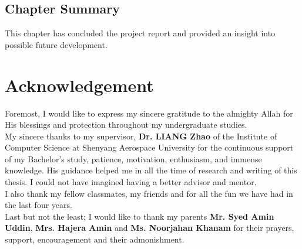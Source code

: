 \documentclass[12pt,a4paper]{article}
\newcommand\tab[1][1cm]{\hspace*{#1}}
\begin{document}
\subsection{Chapter Summary}	
\tab This chapter has concluded the project report and provided an insight into possible future development.
	


\newpage


\newpage
\section*{Acknowledgement}
	\tab Foremost, I would like to express my sincere gratitude to the almighty Allah for His blessings and protection throughout my undergraduate studies.\\ 
\tab My sincere thanks to my supervisor,  \textbf{Dr. LIANG Zhao} of the Institute of Computer Science at Shenyang Aerospace University for the continuous support of my Bachelor's study, patience, motivation, enthusiasm, and immense knowledge. His guidance helped me in all the time of research and writing of this thesis. I could not have imagined having a better advisor and mentor.\\
        \tab I also thank my fellow classmates, my friends and for all the fun we have had in the last four years.\\
        \tab Last but not the least; I would like to thank my parents \textbf{Mr. Syed Amin Uddin}, \textbf{Mrs. Hajera Amin} and \textbf{Ms. Noorjahan Khanam} for their prayers, support, encouragement and their admonishment.\\
\end{document}
